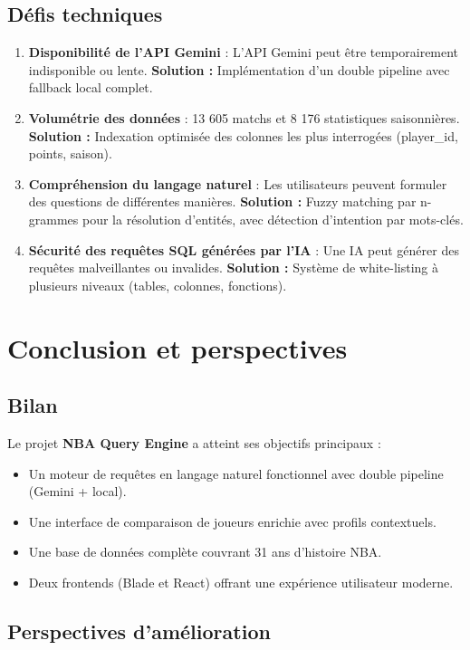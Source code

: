 \documentclass[12pt,a4paper]{report}
\begin{document}
\subsection{Défis techniques}

\begin{enumerate}
    \item \textbf{Disponibilité de l'API Gemini} : L'API Gemini peut être temporairement indisponible ou lente. \textbf{Solution :} Implémentation d'un double pipeline avec fallback local complet.
    \item \textbf{Volumétrie des données} : 13 605 matchs et 8 176 statistiques saisonnières. \textbf{Solution :} Indexation optimisée des colonnes les plus interrogées (player\_id, points, saison).
    \item \textbf{Compréhension du langage naturel} : Les utilisateurs peuvent formuler des questions de différentes manières. \textbf{Solution :} Fuzzy matching par n-grammes pour la résolution d'entités, avec détection d'intention par mots-clés.
    \item \textbf{Sécurité des requêtes SQL générées par l'IA} : Une IA peut générer des requêtes malveillantes ou invalides. \textbf{Solution :} Système de white-listing à plusieurs niveaux (tables, colonnes, fonctions).
\end{enumerate}

\section{Conclusion et perspectives}

\subsection{Bilan}

Le projet \textbf{NBA Query Engine} a atteint ses objectifs principaux :
\begin{itemize}
    \item Un moteur de requêtes en langage naturel fonctionnel avec double pipeline (Gemini + local).
    \item Une interface de comparaison de joueurs enrichie avec profils contextuels.
    \item Une base de données complète couvrant 31 ans d'histoire NBA.
    \item Deux frontends (Blade et React) offrant une expérience utilisateur moderne.
\end{itemize}

\subsection{Perspectives d'amélioration}
\end{document}
